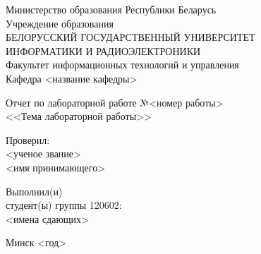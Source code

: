 \thispagestyle{empty}

\begin{center}
  Министерство образования Республики Беларусь \\
  \vspace{0.5ex}
  Учреждение образования \\
  БЕЛОРУССКИЙ ГОСУДАРСТВЕННЫЙ УНИВЕРСИТЕТ \\
  ИНФОРМАТИКИ И РАДИОЭЛЕКТРОНИКИ \\
  \vspace{0.5ex}
  Факультет информационных технологий и управления \\
  \vspace{0.5ex}
  Кафедра <название кафедры>
\end{center}

\vspace{60mm}

\begin{center}
  Отчет по лабораторной работе №<номер работы> \\
  <<Тема лабораторной работы>>
\end{center}

\vspace{20mm}

\begin{multicols}{2}\columnsep=500mm
  \begin{flushleft}
    Проверил: \\
    <ученое звание> \\
    <имя принимающего>
  \end{flushleft}
  \columnbreak
  \begin{flushright}
    Выполнил(и) \\
    студент(ы) группы 120602: \\
    <имена сдающих> 
  \end{flushright}
\end{multicols}

\vspace{80mm}
\begin{center}
Минск <год>
\end{center}

\newpage
